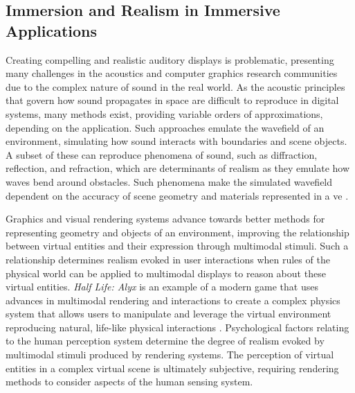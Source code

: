 \subsection{Immersion and Realism in Immersive Applications}
Creating compelling and realistic auditory displays is problematic, presenting many challenges in the acoustics and computer graphics research communities due to the complex nature of sound in the real world. As the acoustic principles that govern how sound propagates in space are difficult to reproduce in digital systems, many methods exist, providing variable orders of approximations, depending on the application. Such approaches emulate the wavefield of an environment, simulating how sound interacts with boundaries and scene objects. A subset of these can reproduce phenomena of sound, such as diffraction, reflection, and refraction, which are determinants of realism as they emulate how waves bend around obstacles. Such phenomena make the simulated wavefield dependent on the accuracy of scene geometry and materials represented in a \acrshort{ve} \citep{kuttruff2016room}.\par
Graphics and visual rendering systems advance towards better methods for representing geometry and objects of an environment, improving the relationship between virtual entities and their expression through multimodal stimuli. Such a relationship determines realism evoked in user interactions when rules of the physical world can be applied to multimodal displays to reason about these virtual entities. \textit{Half Life: Alyx} is an example of a modern game that uses advances in multimodal rendering and interactions to create a complex physics system that allows users to manipulate and leverage the virtual environment reproducing natural, life-like physical interactions \citep{bollmer2022embodied}.
Psychological factors relating to the human perception system determine the degree of realism evoked by multimodal stimuli produced by rendering systems. The perception of virtual entities in a complex virtual scene is ultimately subjective, requiring rendering methods to consider aspects of the human sensing system.\par


